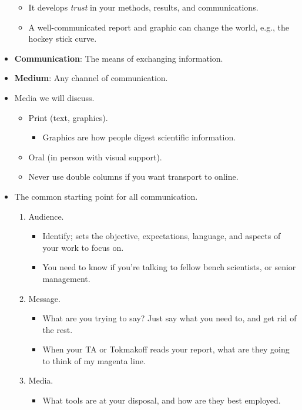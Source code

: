 \documentclass[../notes.tex]{subfiles}
\begin{document}
\begin{itemize}
\begin{itemize}
        \item It develops \emph{trust} in your methods, results, and communications.
        \item A well-communicated report and graphic can change the world, e.g., the hockey stick curve.
    \end{itemize}
    \item \textbf{Communication}: The means of exchanging information.
    \item \textbf{Medium}: Any channel of communication.
    \item Media we will discuss.
    \begin{itemize}
        \item Print (text, graphics).
        \begin{itemize}
            \item Graphics are how people digest scientific information.
        \end{itemize}
        \item Oral (in person with visual support).
        \item Never use double columns if you want transport to online.
    \end{itemize}
    \item The common starting point for all communication.
    \begin{enumerate}
        \item Audience.
        \begin{itemize}
            \item Identify; sets the objective, expectations, language, and aspects of your work to focus on.
            \item You need to know if you're talking to fellow bench scientists, or senior management.
        \end{itemize}
        \item Message.
        \begin{itemize}
            \item What are you trying to say? Just say what you need to, and get rid of the rest.
            \item When your TA or Tokmakoff reads your report, what are they going to think of my magenta line.
        \end{itemize}
        \item Media.
        \begin{itemize}
            \item What tools are at your disposal, and how are they best employed.

\end{itemize}
\end{enumerate}
\end{itemize}
\end{document}
